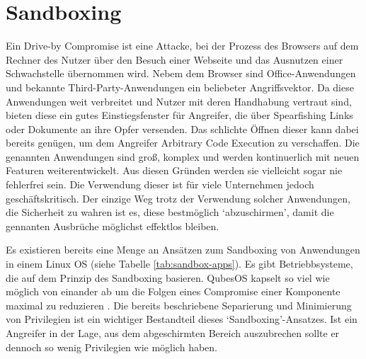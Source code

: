 \section{Sandboxing}

Ein Drive-by Compromise ist eine Attacke, bei der Prozess des Browsers auf dem Rechner des Nutzer über den Besuch einer Webseite und das Ausnutzen einer Schwachstelle übernommen wird. Nebem dem Browser sind Office-Anwendungen und bekannte Third-Party-Anwendungen ein beliebeter Angriffsvektor. Da diese Anwendungen weit verbreitet und Nutzer mit deren Handhabung vertraut sind, bieten diese ein gutes Einstiegsfenster für Angreifer, die über Spearfishing Links oder Dokumente an ihre Opfer
versenden. Das schlichte Öffnen dieser kann dabei bereits genügen, um dem Angreifer Arbitrary Code Execution zu verschaffen. Die genannten Anwendungen sind groß, komplex und werden kontinuerlich mit neuen Featuren weiterentwickelt. Aus diesen Gründen werden sie vielleicht sogar nie fehlerfrei sein. Die Verwendung dieser ist für viele Unternehmen jedoch geschäftskritisch. Der einzige Weg trotz der Verwendung solcher Anwendungen, die Sicherheit zu wahren ist es, diese bestmöglich
`abzuschirmen', damit die gennanten Ausbrüche möglichst effektlos bleiben.

Es existieren bereits eine Menge an Ansätzen zum Sandboxing von Anwendungen in einem Linux OS (siehe Tabelle \ref{tab:sandbox-apps}).
Es gibt Betriebbsysteme, die auf dem Prinzip des Sandboxing basieren. QubesOS kapselt so viel wie möglich von einander ab um die Folgen eines Compromise einer Komponente maximal zu reduzieren \cite{qubes}.
Die bereits beschriebene Separierung und Minimierung von Privilegien ist ein wichtiger Bestandteil dieses `Sandboxing'-Ansatzes. Ist ein Angreifer in der Lage, aus dem abgeschirmten Bereich auszubrechen sollte er dennoch so wenig Privilegien wie möglich haben.

